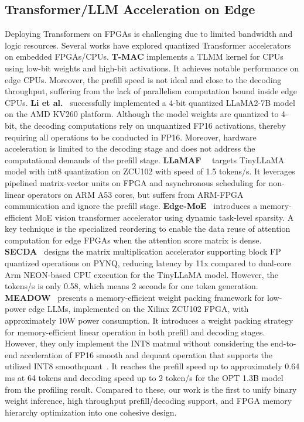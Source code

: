 \documentclass[sigconf]{acmart}
\begin{document}

\subsection{Transformer/LLM Acceleration on Edge}
Deploying Transformers on FPGAs is challenging due to limited bandwidth and logic resources. Several works have explored quantized Transformer accelerators on embedded FPGAs/CPUs. 
\textbf{T-MAC} \cite{tmac} implements a TLMM kernel for CPUs using low-bit weights and high-bit activations. It achieves notable performance on edge CPUs. Moreover, the prefill speed is not ideal and close to the decoding throughput, suffering from the lack of parallelism computation bound inside edge CPUs. \textbf{{Li et al.}}~\cite{li2025pushing} successfully implemented a 4-bit quantized LLaMA2-7B model on the AMD KV260 platform. Although the model weights are quantized to 4-bit, the decoding computations rely on unquantized FP16 activations, thereby requiring all operations to be conducted in FP16. Moreover, hardware acceleration is limited to the decoding stage and does not address the computational demands of the prefill stage. \textbf{LLaMAF}~~\cite{LLaMAf} targets TinyLLaMA model with int8 quantization on ZCU102 with speed of 1.5 tokens/s. It leverages pipelined matrix-vector units on FPGA and asynchronous scheduling for non-linear operators on ARM A53 cores, but suffers from ARM-FPGA communication and ignore the prefill stage. \textbf{Edge-MoE}~\cite{edgemoe} introduces a memory-efficient MoE vision transformer accelerator using dynamic task-level sparsity. 
A key technique is the specialized reordering to enable the data reuse of attention computation for edge FPGAs when the attention score matrix is dense. \textbf{SECDA}~\cite{haris2024designing} designs the matrix multiplication accelerator supporting block FP quantized operations on PYNQ, reducing latency by 11x compared to dual-core Arm NEON-based CPU execution for the TinyLLaMA model. However, the tokens/s is only 0.58, which means 2 seconds for one token generation.
\textbf{MEADOW}~\cite{moitra2025meadow} presents a memory-efficient weight packing framework for low-power edge LLMs, implemented on the Xilinx ZCU102 FPGA, with approximately 10W power consumption. It introduces a weight packing strategy for memory-efficient linear operation in both prefill and decoding stages. However, they only implement the INT8 matmul without considering the end-to-end acceleration of FP16 smooth and dequant operation that supports the utilized INT8 smoothquant~\cite{xiao2023smoothquant}.  
It reaches the prefill speed up to approximately 0.64 ms at 64 tokens and decoding speed up to 2 token/s for the OPT 1.3B model from the profiling result. Compared to these, our work is the first to unify binary weight inference, high throughput prefill/decoding support, and FPGA memory hierarchy optimization into one cohesive design.
\end{document}
